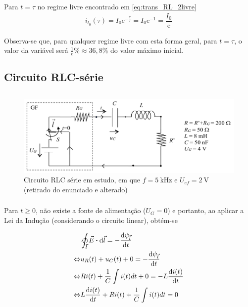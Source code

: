 \documentclass[a4paper, titlepage, portuguese]{article}
\newcommand{\eq}{\Leftrightarrow} %
\newcommand\e{\mathrm{e} }
\begin{document}
	\subsubsection{}
	\par
	Para $t = \tau$ no regime livre encontrado em \eqref{eq:trans_RL_2livre}
	\begin{align*}
		i_{l_0}(\tau) = I_0\e^{-\frac{\tau}{\tau}} = I_0 \e^{-1} = \dfrac{I_0}{\e}
	\end{align*}
	\par
	Observa-se que, para qualquer regime livre com esta forma geral, para $t = \tau$, o valor da variável será $\frac{1}{e}\% \approx 36,8\%$ do valor máximo inicial.

	\subsection{Circuito RLC-série}
	\subsection{}
		\begin{figure}[H]
			\centering
			\includegraphics[width=0.7\linewidth]{rlc.png}
			\caption{Circuito RLC série em estudo, em que $f = \SI{5}{\kilo\hertz}$ e $U_{ef} = \SI{2}{\volt}$ (retirado do enunciado e alterado)}
			\label{fig:circ_rlc}
		\end{figure}
	\subsubsection{}

		\par
		Para $t \geq 0$, não existe a fonte de alimentação ($U_G = 0$) e portanto, ao aplicar a Lei da Indução (considerando o circuito linear), obtém-se

		\begin{align*}
			&\ointclockwise_{\vec{l}} \vec{E} \vdot \dd{\vec{l}} = - \dv{\psi_{\vec{l}}}{t} \\ \eq
			&u_R(t) + u_C(t) + 0 = - \dv{\psi_{\vec{l}}}{t} \\ \eq
			&Ri(t) + \frac{1}{C} \int i(t) dt + 0 = -L \dv{i(t)}{t} \\ \eq
			&L \dv{i(t)}{t} + Ri(t) + \frac{1}{C} \int i(t) dt = 0 \\
		\end{align*}
\end{document}
